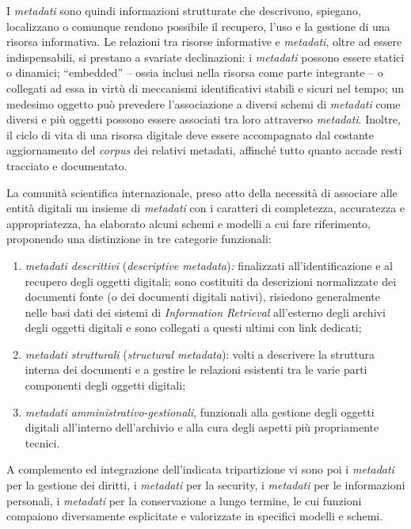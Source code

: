 \documentclass[
  b5paper,
  twoside,
  11pt,
  chapterprefix=false,
  bibliography=totocnumbered,
  parskip=0]{scrbook}
\begin{document}
I \emph{metadati} sono quindi informazioni strutturate che descrivono,
spiegano, localizzano o comunque rendono possibile il recupero, l'uso e
la gestione di una risorsa informativa. Le relazioni tra risorse
informative e \emph{metadati}, oltre ad essere indispensabili, si prestano a
svariate declinazioni: i \emph{metadati} possono essere statici o dinamici;
\enquote{embedded} -- ossia inclusi nella risorsa come parte integrante -- o
collegati ad essa in virtù di meccanismi identificativi stabili e sicuri
nel tempo; un medesimo oggetto può prevedere l'associazione a diversi
schemi di \emph{metadati} come diversi e più oggetti possono essere associati
tra loro attraverso \emph{metadati}. Inoltre, il ciclo di vita di una risorsa
digitale deve essere accompagnato dal costante aggiornamento del
\emph{corpus} dei relativi metadati, affinché tutto quanto accade resti
tracciato e documentato.

La comunità scientifica internazionale, preso atto della necessità di
associare alle entità digitali un insieme di \emph{metadati} con i caratteri
di completezza, accuratezza e appropriatezza, ha elaborato alcuni schemi
e modelli a cui fare riferimento, proponendo una distinzione in tre
categorie funzionali:

\begin{enumerate}
\def\labelenumi{\arabic{enumi}.}
\item
  \emph{metadati descrittivi} (\emph{descriptive metadata})\emph{:} finalizzati
  all'identificazione e al recupero degli oggetti digitali; sono
  costituiti da descrizioni normalizzate dei documenti fonte (o dei
  documenti digitali nativi), risiedono generalmente nelle basi dati
  dei sistemi di \emph{Information Retrieval} all'esterno degli archivi
  degli oggetti digitali e sono collegati a questi ultimi con link
  dedicati;
\item
  \emph{metadati strutturali} (\emph{structural metadata}): volti a descrivere
  la struttura interna dei documenti e a gestire le relazioni
  esistenti tra le varie parti componenti degli oggetti digitali;
\item
  \emph{metadati amministrativo-gestionali}, funzionali alla gestione degli
  oggetti digitali all'interno dell'archivio e alla cura degli
  aspetti più propriamente tecnici.
\end{enumerate}

A complemento ed integrazione dell'indicata tripartizione vi sono poi i
\emph{metadati} per la gestione dei diritti, i \emph{metadati} per la security, i
\emph{metadati} per le informazioni personali, i \emph{metadati} per la
conservazione a lungo termine, le cui funzioni compaiono diversamente
esplicitate e valorizzate in specifici modelli e schemi.
\end{document}
